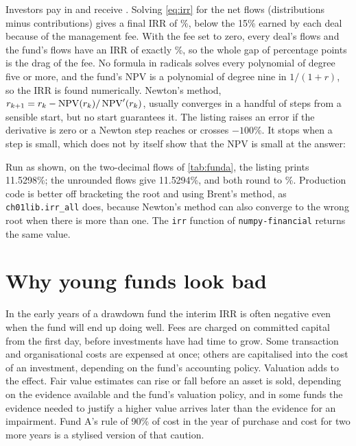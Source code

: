 \begin{chapterrefs}
Investors pay in \fundPaidIn{} and receive \fundDistrib. Solving \cref{eq:irr} for the net flows
(distributions minus contributions) gives a final IRR of \fundIRR\%, below the 15\% earned by each deal
because of the management fee. With the fee set to zero, every deal's flows and the fund's flows
have an IRR of exactly \fundIRRNoFee\%, so the whole gap of \feeDrag{} percentage points is the drag
of the fee. No formula in radicals solves every polynomial of degree five or more, and the fund's NPV is a polynomial of degree nine in $1/(1+r)$, so the IRR is found
numerically. Newton's method, $r_{k+1} = r_k - \operatorname{NPV}(r_k)/\operatorname{NPV}'(r_k)$,
usually converges in a handful of steps from a sensible start, but no start guarantees it. The
listing raises an error if the derivative is zero or a Newton step reaches or crosses $-100\%$. It
stops when a step is small, which does not by itself show that the NPV is small at the answer:

Run as shown, on the two-decimal flows of \cref{tab:funda}, the listing prints 11.5298\%; the
unrounded flows give 11.5294\%, and both round to \fundIRR\%. Production code is better off bracketing the root and using Brent's method, as
\texttt{ch01lib.irr\_all} does, because Newton's method can also converge to the wrong root when there
is more than one. The \texttt{irr} function of \texttt{numpy-financial} \parencite{numpyfinancial}
returns the same value.

\FloatBarrier
\section{Why young funds look bad}
\label{sec:jcurve}

In the early years of a drawdown fund the interim IRR is often negative even when the fund will end
up doing well. Fees are charged on committed capital from the first day, before investments have had time to grow.
Some transaction and organisational costs are expensed at once; others are capitalised into the cost
of an investment, depending on the fund's accounting policy. Valuation adds to the effect. Fair value
estimates can rise or fall before an asset is sold, depending on the evidence available and the
fund's valuation policy, and in some funds the evidence needed to justify a higher value arrives later than the evidence for
an impairment. Fund A's rule of 90\% of cost in the year of
purchase and cost for two more years is a stylised version of that caution.


\end{chapterrefs}

